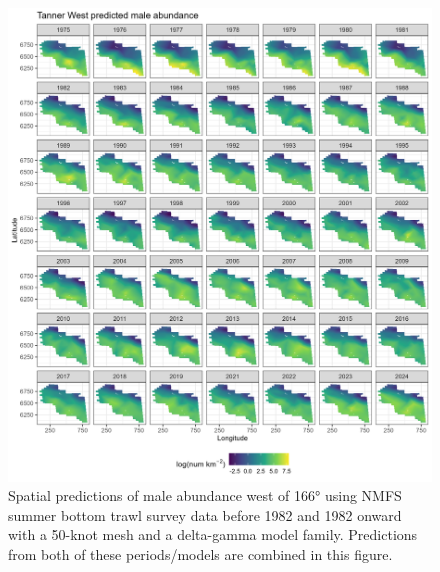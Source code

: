 \documentclass[
]{article}
\begin{document}
\begin{figure}

{\centering \includegraphics[width=1\linewidth,height=1\textheight]{../BAIRDI/Figures/TannerW_male_spatabund} 

}

\caption{Spatial predictions of male abundance west of 166° using NMFS summer bottom trawl survey data before 1982 and 1982 onward with a 50-knot mesh and a delta-gamma model family. Predictions from both of these periods/models are combined in this figure.}\label{fig:spatpred-abund-50-maleW}
\end{figure}
\end{document}
